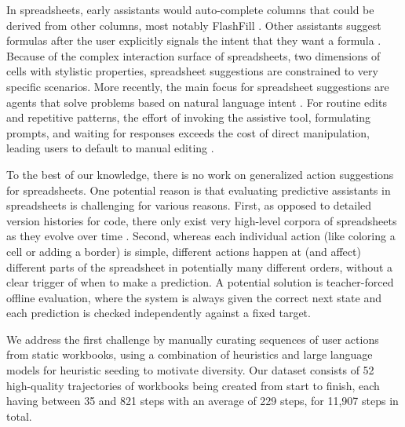\documentclass{article}
\theoremstyle{plain}
\theoremstyle{definition}
\theoremstyle{remark}
\begin{document}
In spreadsheets, early assistants would auto-complete columns that could be derived from other columns, most notably FlashFill \cite{gulwani2011automating,cambronero2023flashfill++}.
Other assistants suggest formulas after the user explicitly signals the intent that they want a formula \cite{chen2021spreadsheetcoder}.
Because of the complex interaction surface of spreadsheets, two dimensions of cells with stylistic properties, spreadsheet suggestions are constrained to very specific scenarios.
More recently, the main focus for spreadsheet suggestions are agents that solve problems based on natural language intent \cite{ma2024spreadsheetbench,li2023sheetcopilot}.
For routine edits and repetitive patterns, the effort of invoking the assistive tool, formulating prompts, and waiting for responses exceeds the cost of direct manipulation, leading users to default to manual editing \cite{vaithilingam2022expectation,liang2025tabletalk}.

To the best of our knowledge, there is no work on generalized action suggestions for spreadsheets.
One potential reason is that evaluating predictive assistants in spreadsheets is challenging for various reasons.
First, as opposed to detailed version histories for code, there only exist very high-level corpora of spreadsheets as they evolve over time \cite{dou2016venron}.
Second, whereas each individual action (like coloring a cell or adding a border) is simple, different actions happen at (and affect) different parts of the spreadsheet in potentially many different orders, without a clear trigger of when to make a prediction.
A potential solution is teacher-forced offline evaluation, where the system is always given the correct next state and each prediction is checked independently against a fixed target.

We address the first challenge by manually curating sequences of user actions from static workbooks, using a combination of heuristics and large language models for heuristic seeding to motivate diversity.
Our dataset consists of 52 high-quality trajectories of workbooks being created from start to finish, each having between 35 and 821 steps with an average of 229 steps, for 11,907 steps in total.
\end{document}
